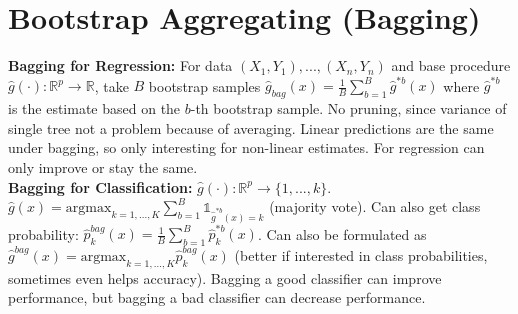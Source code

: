 \section*{Bootstrap Aggregating (Bagging)}
\textbf{Bagging for Regression:} For data $(X_1,Y_1),...,(X_n,Y_n)$ and base procedure $\hat g(\cdot): \mathbb{R}^p\to \mathbb{R}$, take $B$ bootstrap samples $\hat g_{bag}(x) = \frac 1 B \sum_{b=1}^B \hat g^{*b}(x)$ where $\hat g^{*b}$ is the estimate based on the $b$-th bootstrap sample. No pruning, since variance of single tree not a problem because of averaging. Linear predictions are the same under bagging, so only interesting for non-linear estimates. For regression can only improve or stay the same. \\
\textbf{Bagging for Classification:} $\hat g(\cdot): \mathbb{R}^p \to \{1, ..., k\}$. $\hat g (x) = \text{argmax}_{k=1,...,K} \sum_{b=1}^B \mathds{1}_{\hat g^{*b}(x)=k}$ (majority vote). Can also get class probability: $\hat p_k^{bag}(x) = \frac{1}{B} \sum_{b=1}^B \hat p_k^{*b}(x)$. Can also be formulated as $\hat g^{bag}(x) = \text{argmax}_{k=1,...,K} \hat p_k^{bag}(x)$ (better if interested in class probabilities, sometimes even helps accuracy). Bagging a good classifier can improve performance, but bagging a bad classifier can decrease performance. \\

